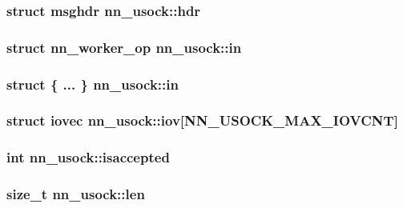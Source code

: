 \subsubsection[{hdr}]{\setlength{\rightskip}{0pt plus 5cm}struct msghdr nn\+\_\+usock\+::hdr}\hypertarget{structnn__usock_a6a5703bf0dcb30238361a7490af587cd}{}\label{structnn__usock_a6a5703bf0dcb30238361a7490af587cd}
\subsubsection[{in}]{\setlength{\rightskip}{0pt plus 5cm}struct {\bf nn\+\_\+worker\+\_\+op} nn\+\_\+usock\+::in}\hypertarget{structnn__usock_aa038b159741f4e987d814f76b0a4df18}{}\label{structnn__usock_aa038b159741f4e987d814f76b0a4df18}
\subsubsection[{in}]{\setlength{\rightskip}{0pt plus 5cm}struct \{ ... \}   nn\+\_\+usock\+::in}\hypertarget{structnn__usock_acdc3e32ab008621c9abeecca2541e43d}{}\label{structnn__usock_acdc3e32ab008621c9abeecca2541e43d}
\subsubsection[{iov}]{\setlength{\rightskip}{0pt plus 5cm}struct iovec nn\+\_\+usock\+::iov\mbox{[}{\bf N\+N\+\_\+\+U\+S\+O\+C\+K\+\_\+\+M\+A\+X\+\_\+\+I\+O\+V\+C\+NT}\mbox{]}}\hypertarget{structnn__usock_af63c29b3e11577d914c9c45db9581a66}{}\label{structnn__usock_af63c29b3e11577d914c9c45db9581a66}
\subsubsection[{isaccepted}]{\setlength{\rightskip}{0pt plus 5cm}int nn\+\_\+usock\+::isaccepted}\hypertarget{structnn__usock_a6a82c1b670fd6515b421311a3fb52029}{}\label{structnn__usock_a6a82c1b670fd6515b421311a3fb52029}
\subsubsection[{len}]{\setlength{\rightskip}{0pt plus 5cm}size\+\_\+t nn\+\_\+usock\+::len}\hypertarget{structnn__usock_a470ef4e0625fba9bb7a08cd36518bcc2}{}\label{structnn__usock_a470ef4e0625fba9bb7a08cd36518bcc2}
